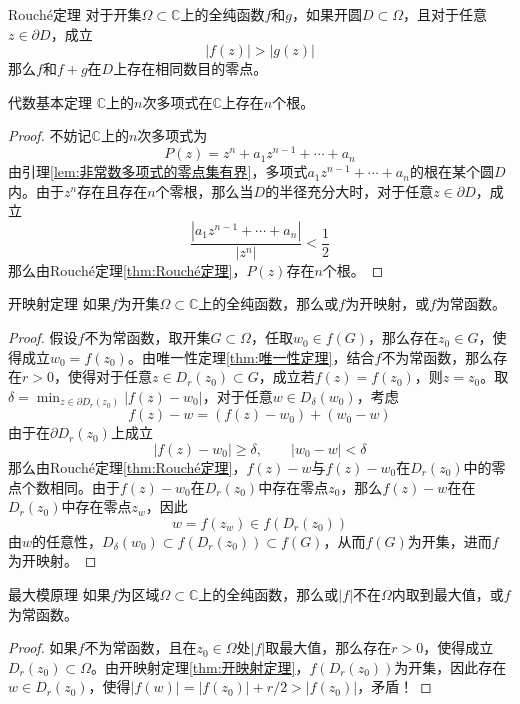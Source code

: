 \documentclass[lang = cn, scheme = chinese, thmcnt = section]{elegantbook}
\newcommand{\C}{\mathbb{C}}  		   %
\newcommand{\sub}{\subset}             %
\newcommand{\dis}{\displaystyle}
\begin{document}
\begin{theorem}{Rouché定理}
	对于开集$\Omega\sub\C$上的全纯函数$f$和$g$，如果开圆$D\sub\Omega$，且对于任意$z\in\partial D$，成立
	$$
	|f(z)|>|g(z)|
	$$
	那么$f$和$f+g$在$D$上存在相同数目的零点。
\end{theorem}

\begin{corollary}{代数基本定理}
	$\C$上的$n$次多项式在$\C$上存在$n$个根。
\end{corollary}

\begin{proof}
	不妨记$\C$上的$n$次多项式为%
	$$
	P(z)=z^n+a_1z^{n-1}+\cdots+a_n
	$$
	由引理\ref{lem:非常数多项式的零点集有界}，多项式$a_1z^{n-1}+\cdots+a_n$的根在某个圆$D$内。由于$z^n$存在且存在$n$个零根，那么当$D$的半径充分大时，对于任意$z\in\partial D$，成立
	$$
	\frac{|a_1z^{n-1}+\cdots+a_n|}{|z^n|}<\frac{1}{2}
	$$
	那么由Rouché定理\ref{thm:Rouché定理}，$P(z)$存在$n$个根。
\end{proof}

\begin{theorem}{开映射定理}
	如果$f$为开集$\Omega\sub\C$上的全纯函数，那么或$f$为开映射，或$f$为常函数。
\end{theorem}

\begin{proof}
	假设$f$不为常函数，取开集$G\sub \Omega$，任取$w_0\in f(G)$，那么存在$z_0\in G$，使得成立$w_0=f(z_0)$。由唯一性定理\ref{thm:唯一性定理}，结合$f$不为常函数，那么存在$r>0$，使得对于任意$z\in D_r(z_0)\sub G$，成立若$f(z)= f(z_0)$，则$z=z_0$。取$\dis\delta=\min_{z\in\partial D_r(z_0)}|f(z)-w_0|$，对于任意$w\in D_\delta(w_0)$，考虑%
	$$
	f(z)-w=(f(z)-w_0)+(w_0-w)
	$$
	由于在$\partial D_r(z_0)$上成立%
	$$
	|f(z)-w_0|\ge\delta,\qquad 
	|w_0-w|<\delta
	$$
	那么由Rouché定理\ref{thm:Rouché定理}，$f(z)-w$与$f(z)-w_0$在$D_r(z_0)$中的零点个数相同。由于$f(z)-w_0$在$D_r(z_0)$中存在零点$z_0$，那么$f(z)-w$在在$D_r(z_0)$中存在零点$z_w$，因此%
	$$
	w=f(z_w)\in f(D_r(z_0))
	$$
	由$w$的任意性，$D_\delta(w_0)\sub f(D_r(z_0))\sub f(G)$，从而$f(G)$为开集，进而$f$为开映射。
\end{proof}

\begin{theorem}{最大模原理}
	如果$f$为区域$\Omega\sub\C$上的全纯函数，那么或$|f|$不在$\Omega$内取到最大值，或$f$为常函数。
\end{theorem}

\begin{proof}
	如果$f$不为常函数，且在$z_0\in\Omega$处$|f|$取最大值，那么存在$r>0$，使得成立$D_r(z_0)\sub\Omega$。由开映射定理\ref{thm:开映射定理}，$f(D_r(z_0))$为开集，因此存在$w\in D_r(z_0)$，使得$|f(w)|=|f(z_0)|+r/2>|f(z_0)|$，矛盾！
\end{proof}
\end{document}
